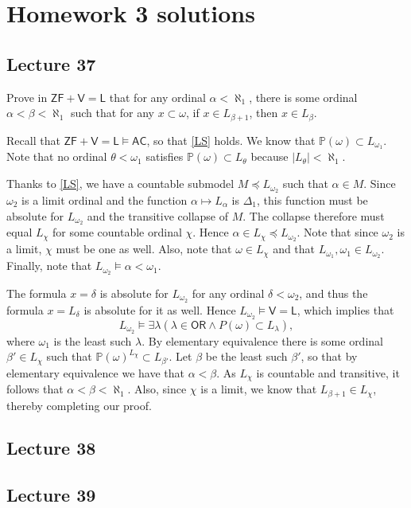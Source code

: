 \documentclass[10pt,letterpaper,cm]{nupset}
\theoremstyle{definition}
\theoremstyle{theorem}
\theoremstyle{remark}
\renewcommand{\P}{\mathbb P}
\newcommand{\1}{\mathbf{1}}
\newcommand{\0}{\vec 0}
\newcommand{\zf}{\mathsf{ZF}}
\newcommand{\ac}{\mathsf{AC}}
\newcommand{\ord}{\mathsf{OR}}
\newcommand{\VL}{\mathsf{V=L}}
\begin{document}
\section{Homework 3 solutions}

\subsection{Lecture 37}

\begin{problem}

Prove in $\zf + \VL$ that for any ordinal $\alpha < \aleph_1$, there is some ordinal $\alpha < \beta < \aleph_1$ such that for any $x\subset \omega$, if $x\in L_{\beta+1}$, then $x\in L_{\beta}$.
\end{problem}
\begin{solution}
Recall that $\zf+ \VL \models \ac$, so that \cref{LS} holds. We know that $\P(\omega)\subset L_{\omega_1}$. Note that no ordinal $\theta < \omega_1$ satisfies $\P(\omega)\subset L_{\theta}$ because $\left\lvert{L_{\theta}}\right\rvert<\aleph_1$.

\smallskip

Thanks to \cref{LS}, we have a countable submodel $M\preceq L_{\omega_2}$ such that ${\alpha}\in M$. Since $\omega_2$ is a limit ordinal and the function $\alpha \mapsto L_{\alpha}$ is $\Delta_1$, this function must be absolute for $L_{\omega_{2}}$ and the transitive collapse of $M$. The collapse therefore must equal $L_{\chi}$ for some countable ordinal $\chi$. Hence ${\alpha}\in  L_{\chi} \preceq L_{\omega_2}$. Note that since $\omega_2$ is a limit, $\chi$ must be one as well. Also, note that $\omega \in L_{\chi}$ and that $L_{\omega_1}, \omega_1 \in L_{\omega_2}$. Finally, note that $L_{\omega_2} \models \alpha < \omega_1$. 

\smallskip

The formula $x=\delta$ is absolute for $L_{\omega_2}$ for any ordinal $\delta < \omega_2$, and thus the formula $x=L_{\delta}$ is absolute for it as well. Hence $L_{\omega_2}\models \VL$, which implies that $$L_{\omega_2}\models \exists \lambda(\lambda \in \ord \land P(\omega)\subset L_{\lambda}),$$ where $\omega_1$ is the least such $\lambda$.
By elementary equivalence there is some ordinal $\beta' \in L_{\chi}$ such that $\P(\omega)^{L_{\chi}}\subset L_{\beta'}$. Let $\beta$ be the least such $\beta '$, so that by elementary equivalence we have that $\alpha <\beta$. As $L_\chi$ is countable and transitive, it follows that $\alpha < \beta < \aleph_1$. Also, since $\chi$ is a limit, we know that $L_{\beta+1}\in L_{\chi}$, thereby completing our proof.
\end{solution}

\subsection{Lecture 38}

\subsection{Lecture 39}
\end{document}
